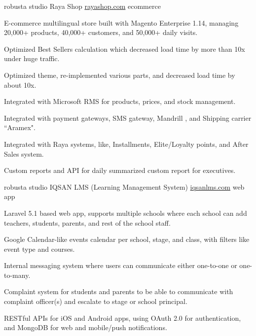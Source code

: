 \begin{cventries}
  \cventry
    {robusta studio} %
    {Raya Shop} %
    {\href{http://www.rayashop.com} {rayashop.com}} %
    {ecommerce} %
    {
      \begin{cvitems} %
        \item {E-commerce multilingual store built with Magento Enterprise 1.14, managing 20,000+ products, 40,000+ customers, and 50,000+ daily visits.}
        \item {Optimized Best Sellers calculation which decreased load time by more than 10x under huge traffic.}
        \item {Optimized theme, re-implemented various parts, and decreased load time by about 10x.}
        \item {Integrated with Microsoft RMS for products, prices, and stock management.}
        \item {Integrated with payment gateways, SMS gateway, Mandrill , and Shipping carrier ``Aramex".}
        \item {Integrated with Raya systems, like, Installments, Elite/Loyalty points, and After Sales system.}
        \item {Custom reports and API for daily summarized custom report for executives.}
      \end{cvitems}
    }


  \cventry
    {robusta studio} %
    {IQSAN LMS (Learning Management System)} %
    {\href{http://www.iqsanlms.com} {iqsanlms.com}} %
    {web app} %
    {
      \begin{cvitems} %
        \item {Laravel 5.1 based web app, supports multiple schools where each school can add teachers, students, parents, and rest of the school staff.}
        \item {Google Calendar-like events calendar per school, stage, and class, with filters like event type and courses.}
        \item {Internal messaging system where users can communicate either one-to-one or one-to-many.}
        \item {Complaint system for students and parents to be able to communicate with complaint officer(s) and escalate to stage or school principal.}
        \item {RESTful APIs for iOS and Android apps, using OAuth 2.0 for authentication, and MongoDB for web and mobile/push notifications.}
      \end{cvitems}
    }



\end{cventries}
